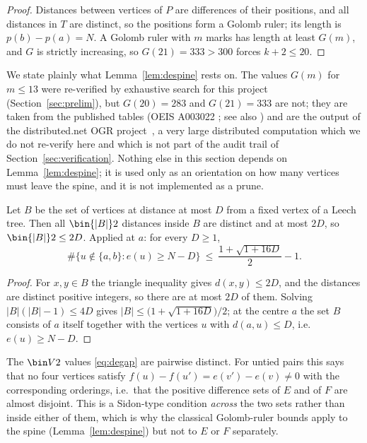 \begin{proof}
Distances between vertices of $P$ are differences of their positions, and all
distances in $T$ are distinct, so the positions form a Golomb ruler; its length
is $p(b)-p(a)=N$.  A Golomb ruler with $m$ marks has length at least $G(m)$, and
$G$ is strictly increasing, so $G(21)=333>300$ forces $k+2\le20$.
\end{proof}

We state plainly what Lemma~\ref{lem:despine} rests on.  The values $G(m)$ for
$m\le13$ were re-verified by exhaustive search for this project
(Section~\ref{sec:prelim}), but $G(20)=283$ and $G(21)=333$ are not; they are
taken from the published tables (OEIS A003022 \cite{OEIS}; see also
\cite{Shearer1990,Dollas1998}) and are the output of the distributed.net OGR
project~\cite{DistributedNetOGR}, a very large distributed computation which we
do not re-verify here and which is not part of the audit trail of
Section~\ref{sec:verification}.  Nothing else in this section depends on
Lemma~\ref{lem:despine}; it is used only as an orientation on how many vertices
must leave the spine, and it is not implemented as a prune.

\begin{lemma}\label{lem:deball}
Let $B$ be the set of vertices at distance at most $D$ from a fixed vertex of a
Leech tree.  Then all $\bin{|B|}2$ distances inside $B$ are distinct and at most
$2D$, so $\bin{|B|}2\le2D$.  Applied at $a$: for every $D\ge1$,
\[
  \#\{u\notin\{a,b\}: e(u)\ge N-D\}\ \le\ \frac{1+\sqrt{1+16D}}2-1 .
\]
\end{lemma}

\begin{proof}
For $x,y\in B$ the triangle inequality gives $d(x,y)\le2D$, and the distances
are distinct positive integers, so there are at most $2D$ of them.  Solving
$|B|(|B|-1)\le4D$ gives $|B|\le\bigl(1+\sqrt{1+16D}\bigr)/2$; at the centre $a$
the set $B$ consists of $a$ itself together with the vertices $u$ with
$d(a,u)\le D$, i.e.\ $e(u)\ge N-D$.
\end{proof}

\begin{remark}\label{rem:decross}
The $\bin V2$ values \eqref{eq:degap} are pairwise distinct.  For untied pairs
this says that no four vertices satisfy $f(u)-f(u')=e(v')-e(v)\ne0$ with the
corresponding orderings, i.e.\ that the positive difference sets of $E$ and of
$F$ are almost disjoint.  This is a Sidon-type condition \emph{across} the two
sets rather than inside either of them, which is why the classical
Golomb-ruler bounds apply to the spine (Lemma~\ref{lem:despine}) but not to $E$
or $F$ separately.
\end{remark}

